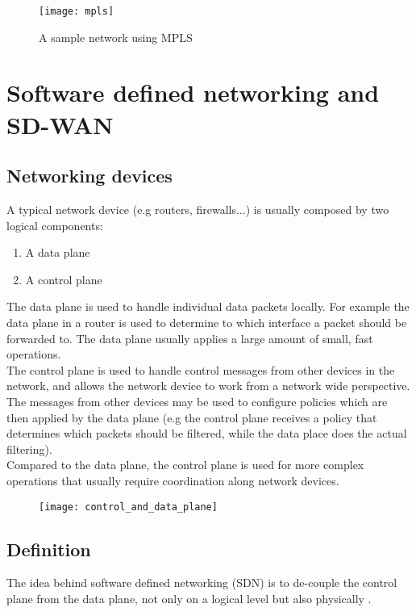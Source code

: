 \begin{figure}[h!]
	\texttt{[image: mpls]}
	\caption{A sample network using MPLS}	
	\centering
\end{figure}

\vspace{0.2cm}

\section{Software defined networking and SD-WAN}

\subsection{Networking devices}
A typical network device (e.g routers, firewalls...) is usually composed by two logical components:
\begin{enumerate}
	\item A data plane 
	\item A control plane
\end{enumerate}

The data plane is used to handle individual data packets locally.
For example the data plane in a router is used to determine to which interface a packet should be forwarded to.
The data plane usually applies a large amount of small, fast operations. \\
The control plane is used to handle control messages from other devices in the network, and allows the network device to work from a network wide perspective. \\
The messages from other devices may be  used to configure policies which are then applied by the data plane (e.g the control plane receives a policy that determines which packets should be filtered, while the data place does the actual filtering). \\
Compared to the data plane, the control plane is used for more complex operations that usually require coordination along network devices.

\vspace*{0.2cm}
\begin{figure}[h!]
	\texttt{[image: control\_and\_data\_plane]}	
	\centering
\end{figure}



\subsection{Definition}
The idea behind software defined networking (SDN) is to de-couple the control plane from the data plane, not only on a logical level but also physically \cite{6834762} .

